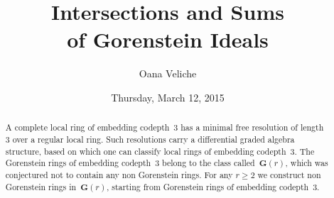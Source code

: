 \documentclass{UAmathtalk}
\author{Oana Veliche}
\title{Intersections and Sums\\ of Gorenstein Ideals}
\date{Thursday, March 12, 2015}
\begin{document}
\maketitle

\begin{abstract}
A complete local ring of embedding codepth~$3$ has a minimal free
resolution of length~$3$ over a regular local ring.
Such resolutions carry a differential graded algebra structure, based on which one can classify local rings of embedding codepth~$3$.
The Gorenstein rings of embedding codepth~$3$ belong to the class called~$\mathbf{G}(r)$, which was conjectured not to contain any non Gorenstein rings.
For any $r\geq 2$ we construct non Gorenstein rings in~$\mathbf{G}(r)$, starting from Gorenstein rings of embedding codepth~$3$.
\end{abstract}
\end{document}
